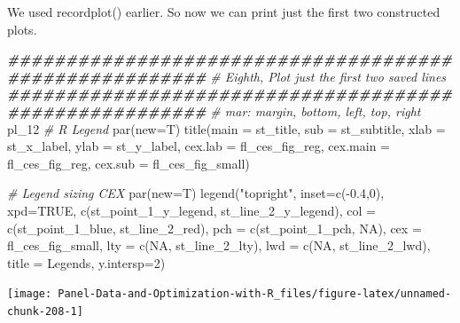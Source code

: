 \documentclass[
]{book}
\newenvironment{Shaded}{\begin{snugshade}}{\end{snugshade}}
\newcommand{\AttributeTok}[1]{\textcolor[rgb]{0.77,0.63,0.00}{#1}}
\newcommand{\CommentTok}[1]{\textcolor[rgb]{0.56,0.35,0.01}{\textit{#1}}}
\newcommand{\ConstantTok}[1]{\textcolor[rgb]{0.00,0.00,0.00}{#1}}
\newcommand{\DecValTok}[1]{\textcolor[rgb]{0.00,0.00,0.81}{#1}}
\newcommand{\DocumentationTok}[1]{\textcolor[rgb]{0.56,0.35,0.01}{\textbf{\textit{#1}}}}
\newcommand{\FloatTok}[1]{\textcolor[rgb]{0.00,0.00,0.81}{#1}}
\newcommand{\FunctionTok}[1]{\textcolor[rgb]{0.00,0.00,0.00}{#1}}
\newcommand{\NormalTok}[1]{#1}
\newcommand{\SpecialCharTok}[1]{\textcolor[rgb]{0.00,0.00,0.00}{#1}}
\newcommand{\StringTok}[1]{\textcolor[rgb]{0.31,0.60,0.02}{#1}}
\begin{document}
We used recordplot() earlier. So now we can print just the first two constructed plots.

\begin{Shaded}
\begin{Highlighting}[]
\DocumentationTok{\#\#\#\#\#\#\#\#\#\#\#\#\#\#\#\#\#\#\#\#\#\#\#\#\#\#\#\#\#\#\#\#\#\#\#\#\#\#\#\#\#\#\#\#\#\#\#\#\#\#\#\#\#\#\#}
\CommentTok{\# Eighth, Plot just the first two saved lines}
\DocumentationTok{\#\#\#\#\#\#\#\#\#\#\#\#\#\#\#\#\#\#\#\#\#\#\#\#\#\#\#\#\#\#\#\#\#\#\#\#\#\#\#\#\#\#\#\#\#\#\#\#\#\#\#\#\#\#\#}
\CommentTok{\# mar: margin, bottom, left, top, right}
\NormalTok{pl\_12}
\CommentTok{\# R Legend}
\FunctionTok{par}\NormalTok{(}\AttributeTok{new=}\NormalTok{T)}
\FunctionTok{title}\NormalTok{(}\AttributeTok{main =}\NormalTok{ st\_title, }\AttributeTok{sub =}\NormalTok{ st\_subtitle, }\AttributeTok{xlab =}\NormalTok{ st\_x\_label, }\AttributeTok{ylab =}\NormalTok{ st\_y\_label,}
      \AttributeTok{cex.lab =}\NormalTok{ fl\_ces\_fig\_reg,}
      \AttributeTok{cex.main =}\NormalTok{ fl\_ces\_fig\_reg,}
      \AttributeTok{cex.sub =}\NormalTok{ fl\_ces\_fig\_small)}

\CommentTok{\# Legend sizing CEX}
\FunctionTok{par}\NormalTok{(}\AttributeTok{new=}\NormalTok{T)}
\FunctionTok{legend}\NormalTok{(}\StringTok{"topright"}\NormalTok{,}
       \AttributeTok{inset=}\FunctionTok{c}\NormalTok{(}\SpecialCharTok{{-}}\FloatTok{0.4}\NormalTok{,}\DecValTok{0}\NormalTok{),}
       \AttributeTok{xpd=}\ConstantTok{TRUE}\NormalTok{,}
       \FunctionTok{c}\NormalTok{(st\_point\_1\_y\_legend, st\_line\_2\_y\_legend),}
       \AttributeTok{col =} \FunctionTok{c}\NormalTok{(st\_point\_1\_blue, st\_line\_2\_red),}
       \AttributeTok{pch =} \FunctionTok{c}\NormalTok{(st\_point\_1\_pch, }\ConstantTok{NA}\NormalTok{),}
       \AttributeTok{cex =}\NormalTok{ fl\_ces\_fig\_small,}
       \AttributeTok{lty =} \FunctionTok{c}\NormalTok{(}\ConstantTok{NA}\NormalTok{, st\_line\_2\_lty),}
       \AttributeTok{lwd =} \FunctionTok{c}\NormalTok{(}\ConstantTok{NA}\NormalTok{, st\_line\_2\_lwd),}
       \AttributeTok{title =} \StringTok{\textquotesingle{}Legends\textquotesingle{}}\NormalTok{,}
       \AttributeTok{y.intersp=}\DecValTok{2}\NormalTok{)}
\end{Highlighting}
\end{Shaded}

\begin{center}\texttt{[image: Panel-Data-and-Optimization-with-R\_files/figure-latex/unnamed-chunk-208-1]} \end{center}
\end{document}
